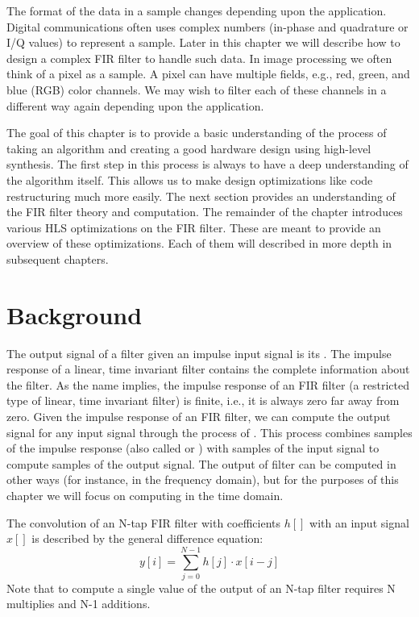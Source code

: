 The format of the data in a sample changes depending upon the application. Digital communications often uses complex numbers (in-phase and quadrature or I/Q values) to represent a sample. Later in this chapter we will describe how to design a complex FIR filter to handle such data. In image processing we often think of a pixel as a sample. A pixel can have multiple fields, e.g., red, green, and blue (RGB) color channels.  We may wish to filter each of these channels in a different way again depending upon the application.

The goal of this chapter is to provide a basic understanding of the process of taking an algorithm and creating a good hardware design using high-level synthesis. The first step in this process is always to have a deep understanding of the algorithm itself. This allows us to make design optimizations like code restructuring much more easily. The next section provides an understanding of the FIR filter theory and computation. The remainder of the chapter introduces various HLS optimizations on the FIR filter. These are meant to provide an overview of these optimizations. Each of them will described in more depth in subsequent chapters. 

\section{Background}

The output signal of a filter given an impulse input signal is its . The impulse response of a linear, time invariant filter contains the complete information about the filter. As the name implies, the impulse response of an FIR filter (a restricted type of linear, time invariant filter) is finite, i.e., it is always zero far away from zero.  Given the impulse response of an FIR filter, we can compute the output signal for any input signal through the process of .  This process combines samples of the impulse response (also called  or ) with samples of the input signal to compute samples of the output signal.  The output of filter can be computed in other ways (for instance, in the frequency domain), but for the purposes of this chapter we will focus on computing in the time domain.

The convolution of an N-tap FIR filter with coefficients $h[]$ with an input signal $x[]$ is described by the general difference equation:
\begin{equation}
y[i] =  \displaystyle\sum\limits_{j=0}^{N-1} h[j] \cdot x[i-j]
\end{equation}
Note that to compute a single value of the output of an N-tap filter requires N multiplies and N-1 additions.

